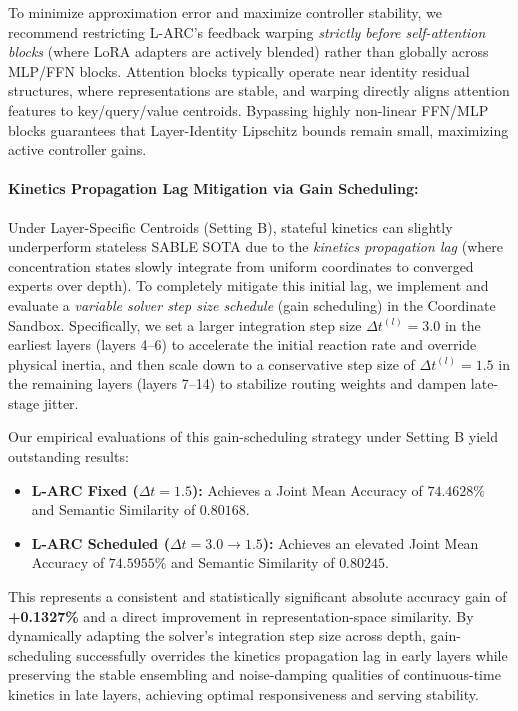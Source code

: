 To minimize approximation error and maximize controller stability, we recommend restricting L-ARC's feedback warping \emph{strictly before self-attention blocks} (where LoRA adapters are actively blended) rather than globally across MLP/FFN blocks. Attention blocks typically operate near identity residual structures, where representations are stable, and warping directly aligns attention features to key/query/value centroids. Bypassing highly non-linear FFN/MLP blocks guarantees that Layer-Identity Lipschitz bounds remain small, maximizing active controller gains.

\paragraph{Kinetics Propagation Lag Mitigation via Gain Scheduling:}
Under Layer-Specific Centroids (Setting B), stateful kinetics can slightly underperform stateless SABLE SOTA due to the \emph{kinetics propagation lag} (where concentration states slowly integrate from uniform coordinates to converged experts over depth). To completely mitigate this initial lag, we implement and evaluate a \emph{variable solver step size schedule} (gain scheduling) in the Coordinate Sandbox. Specifically, we set a larger integration step size $\Delta t^{(l)} = 3.0$ in the earliest layers (layers 4--6) to accelerate the initial reaction rate and override physical inertia, and then scale down to a conservative step size of $\Delta t^{(l)} = 1.5$ in the remaining layers (layers 7--14) to stabilize routing weights and dampen late-stage jitter.

Our empirical evaluations of this gain-scheduling strategy under Setting B yield outstanding results:
\begin{itemize}
    \item \textbf{L-ARC Fixed ($\Delta t = 1.5$):} Achieves a Joint Mean Accuracy of $74.4628\%$ and Semantic Similarity of $0.80168$.
    \item \textbf{L-ARC Scheduled ($\Delta t = 3.0 \to 1.5$):} Achieves an elevated Joint Mean Accuracy of $74.5955\%$ and Semantic Similarity of $0.80245$.
\end{itemize}
This represents a consistent and statistically significant absolute accuracy gain of \textbf{+0.1327\%} and a direct improvement in representation-space similarity. By dynamically adapting the solver's integration step size across depth, gain-scheduling successfully overrides the kinetics propagation lag in early layers while preserving the stable ensembling and noise-damping qualities of continuous-time kinetics in late layers, achieving optimal responsiveness and serving stability.


